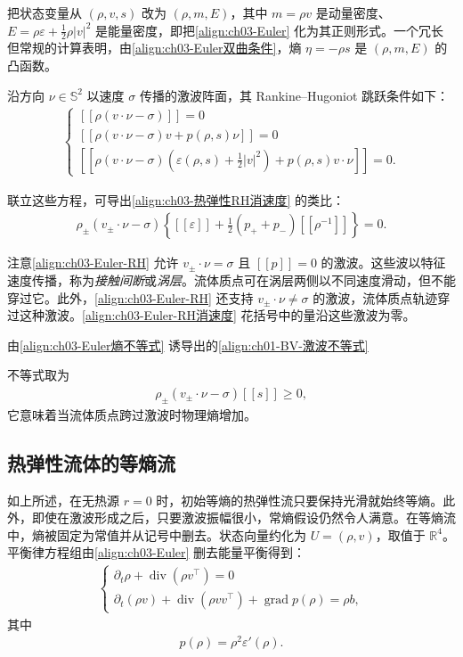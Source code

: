 ﻿\documentclass[../../main.tex]{subfiles}
\begin{document}
把状态变量从 $(\rho,v,s)$ 改为 $(\rho,m,E)$，其中 $m=\rho v$ 是动量密度、$E=\rho\varepsilon+\frac{1}{2}\rho|v|^{2}$ 是能量密度，即把\eqref{align:ch03-Euler} 化为其正则形式。一个冗长但常规的计算表明，由\eqref{align:ch03-Euler双曲条件}，熵 $\eta=-\rho s$ 是 $(\rho,m,E)$ 的凸函数。

沿方向 $\nu\in\mathbb{S}^{2}$ 以速度 $\sigma$ 传播的激波阵面，其 Rankine--Hugoniot 跳跃条件如下：
\begin{align}
\begin{cases}
[\![\rho(v\cdot\nu-\sigma)]\!]=0\\
[\![\rho(v\cdot\nu-\sigma)v+p(\rho,s)\nu]\!]=0\\
[\![\rho(v\cdot\nu-\sigma)\left(\varepsilon(\rho,s)+\frac{1}{2}|v|^{2}\right)+p(\rho,s)v\cdot\nu]\!]=0.
\end{cases}
\label{align:ch03-Euler-RH}
\end{align}

联立这些方程，可导出\eqref{align:ch03-热弹性RH消速度} 的类比：
\begin{align}
\rho_{\pm}(v_{\pm}\cdot\nu-\sigma)\left\{[\![\varepsilon]\!]+\frac{1}{2}(p_{+}+p_{-})[\![\rho^{-1}]\!]\right\}=0.
\label{align:ch03-Euler-RH消速度}
\end{align}

注意\eqref{align:ch03-Euler-RH} 允许 $v_{\pm}\cdot\nu=\sigma$ 且 $[\![p]\!]=0$ 的激波。这些波以特征速度传播，称为\emph{接触间断}或\emph{涡层}。流体质点可在涡层两侧以不同速度滑动，但不能穿过它。此外，\eqref{align:ch03-Euler-RH} 还支持 $v_{\pm}\cdot\nu\neq\sigma$ 的激波，流体质点轨迹穿过这种激波。\eqref{align:ch03-Euler-RH消速度} 花括号中的量沿这些激波为零。

由\eqref{align:ch03-Euler熵不等式} 诱导出的\eqref{align:ch01-BV-激波不等式}%

不等式取为
\begin{align}
\rho_{\pm}(v_{\pm}\cdot\nu-\sigma)[\![s]\!]\geqslant0,
\label{align:ch03-Euler熵增}
\end{align}
它意味着当流体质点跨过激波时物理熵增加。

\subsection{热弹性流体的等熵流}\label{subsection:ch03-等熵流}

如上所述，在无热源 $r=0$ 时，初始等熵的热弹性流只要保持光滑就始终等熵。此外，即使在激波形成之后，只要激波振幅很小，常熵假设仍然令人满意。在等熵流中，熵被固定为常值并从记号中删去。状态向量约化为 $U=(\rho,v)$，取值于 $\mathbb{R}^{4}$。平衡律方程组由\eqref{align:ch03-Euler} 删去能量平衡得到：
\begin{align}
\begin{cases}
\partial_{t}\rho+\operatorname{div}(\rho v^{\top})=0\\
\partial_{t}(\rho v)+\operatorname{div}(\rho vv^{\top})+\operatorname{grad}p(\rho)=\rho b,
\end{cases}
\label{align:ch03-等熵Euler}
\end{align}
其中
\begin{align}
p(\rho)=\rho^{2}\varepsilon'(\rho).
\label{align:ch03-等熵Euler本构}
\end{align}
\end{document}
